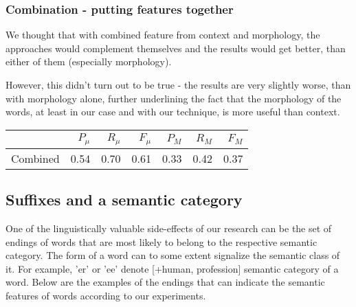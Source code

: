 \documentclass[letterpaper]{article}
\begin{document}
\subsubsection{Combination - putting features together}
We thought that with combined feature from context and morphology, the approaches would complement 
themselves and the results would get better, than either of them (especially morphology).

However, this didn't turn out to be true - the results are very slightly worse, than with morphology alone, 
further underlining the fact that the morphology of the words, at least in our case and with our technique, 
is more useful than context.

\begin{tabular}{|r|r|r|r|r|r|r|}
 \hline
 & $P_\mu$ & $R_\mu$ & $F_\mu$ & $P_M$ & $R_M$  & $F_M$ \\ \hline
Combined & 0.54 & 0.70 & 0.61 & 0.33 & 0.42 & 0.37 \\ \hline
\end{tabular}


\subsection{Suffixes and a semantic category}
One of the linguistically valuable side-effects of our research can be 
the set of endings of words that are most likely to belong to the
respective semantic category.
The form of a word can to some extent signalize the semantic class of it. 
For example, 'er' or 'ee' denote [+human, profession] semantic category of a word.
Below are the examples of the endings that
can indicate the semantic features of words according to our experiments.

\end{document}
